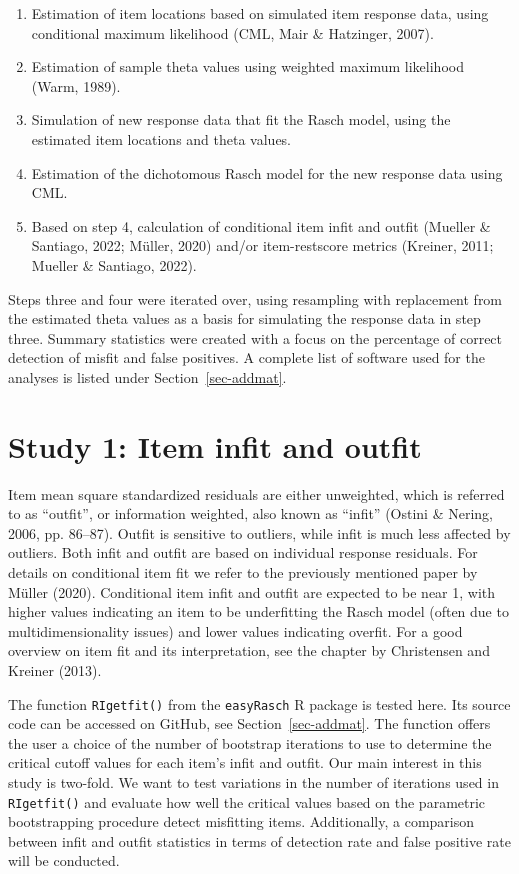 \documentclass[
  letterpaper,
  DIV=11,
  numbers=noendperiod]{scrartcl}
\providecommand{\tightlist}{%
  \setlength{\itemsep}{0pt}\setlength{\parskip}{0pt}}\usepackage{longtable,booktabs,array}
\begin{document}
\begin{enumerate}
\def\labelenumi{\arabic{enumi}.}
\tightlist
\item
  Estimation of item locations based on simulated item response data,
  using conditional maximum likelihood (CML, Mair \& Hatzinger, 2007).
\item
  Estimation of sample theta values using weighted maximum likelihood
  (Warm, 1989).
\item
  Simulation of new response data that fit the Rasch model, using the
  estimated item locations and theta values.
\item
  Estimation of the dichotomous Rasch model for the new response data
  using CML.
\item
  Based on step 4, calculation of conditional item infit and outfit
  (Mueller \& Santiago, 2022; Müller, 2020) and/or item-restscore
  metrics (Kreiner, 2011; Mueller \& Santiago, 2022).
\end{enumerate}

Steps three and four were iterated over, using resampling with
replacement from the estimated theta values as a basis for simulating
the response data in step three. Summary statistics were created with a
focus on the percentage of correct detection of misfit and false
positives. A complete list of software used for the analyses is listed
under Section~\ref{sec-addmat}.

\section{Study 1: Item infit and
outfit}\label{study-1-item-infit-and-outfit}

Item mean square standardized residuals are either unweighted, which is
referred to as ``outfit'', or information weighted, also known as
``infit'' (Ostini \& Nering, 2006, pp. 86--87). Outfit is sensitive to
outliers, while infit is much less affected by outliers. Both infit and
outfit are based on individual response residuals. For details on
conditional item fit we refer to the previously mentioned paper by
Müller (2020). Conditional item infit and outfit are expected to be near
1, with higher values indicating an item to be underfitting the Rasch
model (often due to multidimensionality issues) and lower values
indicating overfit. For a good overview on item fit and its
interpretation, see the chapter by Christensen and Kreiner (2013).

The function \texttt{RIgetfit()} from the \texttt{easyRasch} R package
is tested here. Its source code can be accessed on GitHub, see
Section~\ref{sec-addmat}. The function offers the user a choice of the
number of bootstrap iterations to use to determine the critical cutoff
values for each item's infit and outfit. Our main interest in this study
is two-fold. We want to test variations in the number of iterations used
in \texttt{RIgetfit()} and evaluate how well the critical values based
on the parametric bootstrapping procedure detect misfitting items.
Additionally, a comparison between infit and outfit statistics in terms
of detection rate and false positive rate will be conducted.
\end{document}
